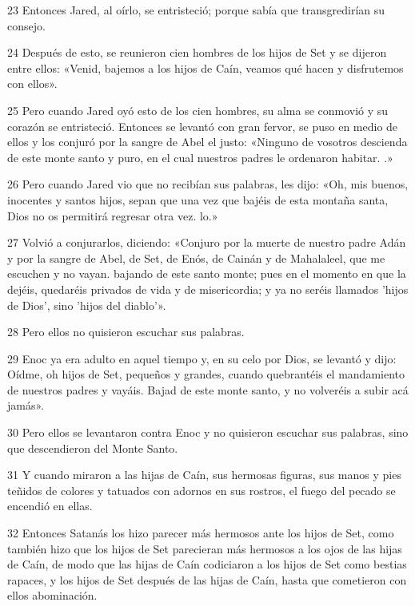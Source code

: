 \par 23 Entonces Jared, al oírlo, se entristeció; porque sabía que transgredirían su consejo.

\par 24 Después de esto, se reunieron cien hombres de los hijos de Set y se dijeron entre ellos: «Venid, bajemos a los hijos de Caín, veamos qué hacen y disfrutemos con ellos».

\par 25 Pero cuando Jared oyó esto de los cien hombres, su alma se conmovió y su corazón se entristeció. Entonces se levantó con gran fervor, se puso en medio de ellos y los conjuró por la sangre de Abel el justo: «Ninguno de vosotros descienda de este monte santo y puro, en el cual nuestros padres le ordenaron habitar. .»

\par 26 Pero cuando Jared vio que no recibían sus palabras, les dijo: «Oh, mis buenos, inocentes y santos hijos, sepan que una vez que bajéis de esta montaña santa, Dios no os permitirá regresar otra vez. lo.»

\par 27 Volvió a conjurarlos, diciendo: «Conjuro por la muerte de nuestro padre Adán y por la sangre de Abel, de Set, de Enós, de Cainán y de Mahalaleel, que me escuchen y no vayan. bajando de este santo monte; pues en el momento en que la dejéis, quedaréis privados de vida y de misericordia; y ya no seréis llamados 'hijos de Dios', sino 'hijos del diablo'».

\par 28 Pero ellos no quisieron escuchar sus palabras.

\par 29 Enoc ya era adulto en aquel tiempo y, en su celo por Dios, se levantó y dijo: Oídme, oh hijos de Set, pequeños y grandes, cuando quebrantéis el mandamiento de nuestros padres y vayáis. Bajad de este monte santo, y no volveréis a subir acá jamás».

\par 30 Pero ellos se levantaron contra Enoc y no quisieron escuchar sus palabras, sino que descendieron del Monte Santo.

\par 31 Y cuando miraron a las hijas de Caín, sus hermosas figuras, sus manos y pies teñidos de colores y tatuados con adornos en sus rostros, el fuego del pecado se encendió en ellas.

\par 32 Entonces Satanás los hizo parecer más hermosos ante los hijos de Set, como también hizo que los hijos de Set parecieran más hermosos a los ojos de las hijas de Caín, de modo que las hijas de Caín codiciaron a los hijos de Set como bestias rapaces, y los hijos de Set después de las hijas de Caín, hasta que cometieron con ellos abominación.

